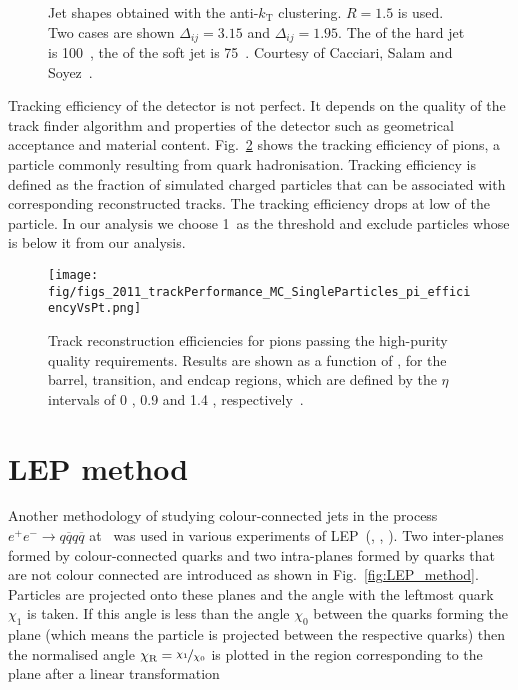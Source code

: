 \begin{figure}[hbtp]
  \def\twidth{0.5}
  \hfil
   \caption{Jet shapes obtained with the anti-$k_\text{T}$ clustering. $R=1.5$ is used. Two cases are shown \textendash $\Delta_{ij}=3.15$ and  $\Delta_{ij}=1.95$. The \pt of the hard jet is 100~\GeV, the \pt of the soft jet is 75~\GeV. Courtesy of Cacciari, Salam and Soyez~\cite{github:antikt}.}
  \label{fig:anti_kt}
\end{figure}

Tracking efficiency of the detector is not perfect. It depends on the quality of the track finder algorithm and properties of the detector such as geometrical acceptance and material content. Fig.~\ref{fig:2011_trackPerformance_MC_SingleParticles_pi_efficiencyVsPt} shows the tracking efficiency of pions, a particle commonly resulting from quark hadronisation. Tracking efficiency is defined as the fraction of simulated charged particles that can be associated with corresponding reconstructed tracks. The tracking efficiency drops at low \pt of the particle. In our analysis we choose 1~\GeV as the threshold and exclude particles whose \pt is below it from our analysis.

\begin{figure}[hbtp]
  \centering
  \texttt{[image: fig/figs\_2011\_trackPerformance\_MC\_SingleParticles\_pi\_efficiencyVsPt.png]}
    \caption{Track reconstruction efficiencies for pions passing the high-purity quality requirements. Results are shown as a function of \pt, for the barrel, transition, and endcap regions, which are defined by the $\eta$ intervals of 0 , 0.9  and 1.4 , respectively~\cite{Chatrchyan:2014fea}.}
    \label{fig:2011_trackPerformance_MC_SingleParticles_pi_efficiencyVsPt}
\end{figure}

\section{LEP method}

Another methodology of studying colour-connected jets in the process $e^{+}e^{-}\rightarrow q\overline{q}q\overline{q}$ at ~\GeV was used in various experiments of LEP~(\cite{Abdallah:2006uq}, \cite{Abbiendi:2005es}, \cite{Achard:2003pe}). Two inter-\PW planes formed by colour-connected quarks and two intra-\PW planes formed by quarks that are not colour connected are introduced as shown in Fig.~\ref{fig:LEP_method}. Particles are projected onto these planes and the angle with the leftmost quark $\chi_{1}$ is taken. If this angle is less than the angle $\chi_{0}$ between the quarks forming the plane (which means the particle is projected between the respective quarks) then the normalised angle $\chi_{\text{R}}=\nicefrac{\chi_{1}}{\chi_{0}}$ is plotted in the region corresponding to the plane after a linear transformation

